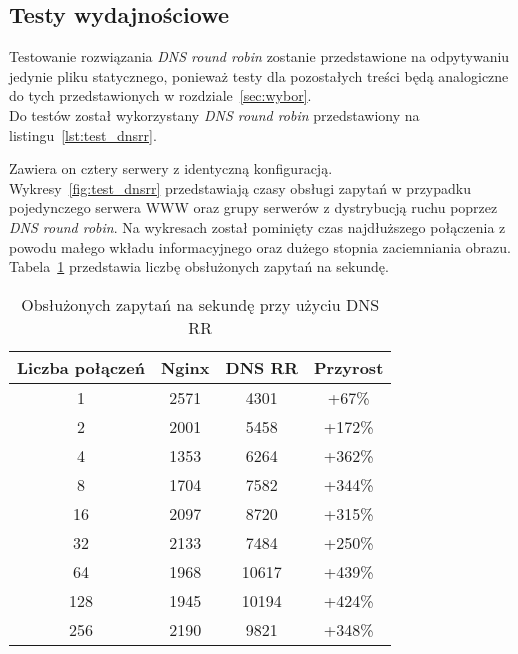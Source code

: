 \subsection{Testy wydajnościowe}
Testowanie rozwiązania \textit{DNS round robin} zostanie przedstawione na odpytywaniu jedynie pliku statycznego, ponieważ testy dla pozostałych treści będą analogiczne do tych przedstawionych w rozdziale~\ref{sec:wybor}.\\
Do testów został wykorzystany \textit{DNS round robin} przedstawiony na listingu~\ref{lst:test_dnsrr}.

Zawiera on cztery serwery z identyczną konfiguracją.\\
Wykresy~\ref{fig:test_dnsrr} przedstawiają czasy obsługi zapytań w przypadku pojedynczego serwera WWW oraz grupy serwerów z dystrybucją ruchu poprzez \textit{DNS round robin}.
Na wykresach został pominięty czas najdłuższego połączenia z powodu małego wkładu informacyjnego oraz dużego stopnia zaciemniania obrazu.
Tabela~\ref{tab:test_dnsrr} przedstawia liczbę obsłużonych zapytań na sekundę.
\begin{table}[h]
\centering
\begin{tabular}{cccc}
	\toprule
	Liczba połączeń & Nginx & DNS RR & Przyrost\\
	\midrule
	\midrule
	1&2571&4301& +67\%\\
	\midrule
	2&2001&5458& +172\%\\
	\midrule
	4&1353&6264& +362\%\\
	\midrule
	8&1704&7582& +344\%\\
	\midrule
	16&2097&8720& +315\%\\
	\midrule
	32&2133&7484& +250\%\\
	\midrule
	64&1968&10617& +439\%\\
	\midrule
	128&1945&10194& +424\%\\
	\midrule
	256&2190&9821& +348\%\\
	\bottomrule
\end{tabular}
\caption{Obsłużonych zapytań na sekundę przy użyciu DNS RR}
\label{tab:test_dnsrr}
\end{table}
